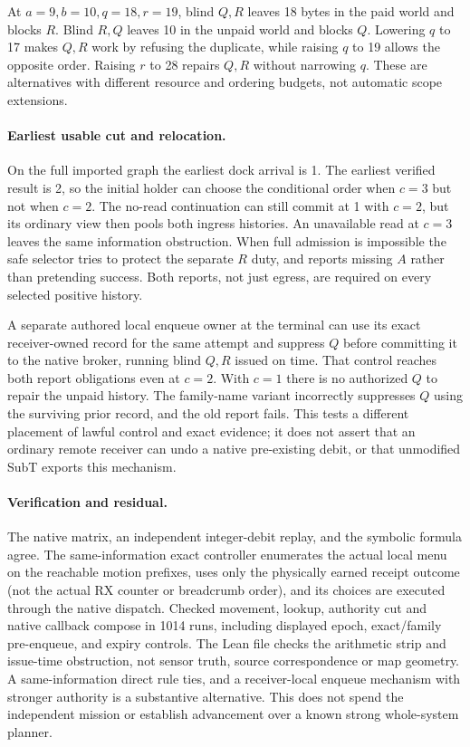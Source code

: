 \documentclass{article}
\begin{document}
At $a=9,b=10,q=18,r=19$, blind $Q,R$ leaves 18 bytes in the paid
world and blocks $R$. Blind $R,Q$ leaves 10 in the unpaid world
and blocks $Q$. Lowering $q$ to 17 makes $Q,R$ work by refusing
the duplicate, while raising $q$ to 19 allows the opposite
order. Raising $r$ to 28 repairs $Q,R$ without narrowing $q$.
These are alternatives with different resource and ordering
budgets, not automatic scope extensions.

\paragraph{Earliest usable cut and relocation.}
On the full imported graph the earliest dock arrival is 1.
The earliest verified result is 2, so the initial holder
can choose the conditional order when $c=3$ but not when $c=2$.
The no-read continuation can still commit at 1 with $c=2$,
but its ordinary view then pools both ingress histories. An
unavailable read at $c=3$ leaves the same information obstruction.
When full admission is impossible the safe selector tries to
protect the separate $R$ duty, and reports missing $A$ rather
than pretending success. Both reports, not just egress, are
required on every selected positive history.

A separate authored local enqueue owner at the terminal can use
its exact receiver-owned record for the same attempt and suppress
$Q$ before committing it to the native broker, running blind
$Q,R$ issued on time. That control reaches both report obligations
even at $c=2$. With $c=1$ there is no authorized $Q$ to repair
the unpaid history. The family-name variant incorrectly suppresses
$Q$ using the surviving prior record, and the old report fails.
This tests a different placement of lawful control and exact evidence;
it does not assert that an ordinary remote receiver can undo a native
pre-existing debit, or that unmodified SubT exports this mechanism.

\paragraph{Verification and residual.}
The native matrix, an independent integer-debit replay, and the
symbolic formula agree. The same-information exact controller
enumerates the actual local menu on the reachable motion prefixes,
uses only the physically earned receipt outcome (not the actual
RX counter or breadcrumb order), and its choices are executed
through the native dispatch. Checked movement, lookup, authority
cut and native callback compose in 1014 runs, including displayed
epoch, exact/family pre-enqueue, and expiry controls. The Lean
file checks the arithmetic strip and issue-time obstruction,
not sensor truth, source correspondence or map geometry.
A same-information direct rule ties, and a receiver-local
enqueue mechanism with stronger authority is a substantive
alternative. This does not spend the independent mission or
establish advancement over a known strong whole-system planner.
\end{document}
